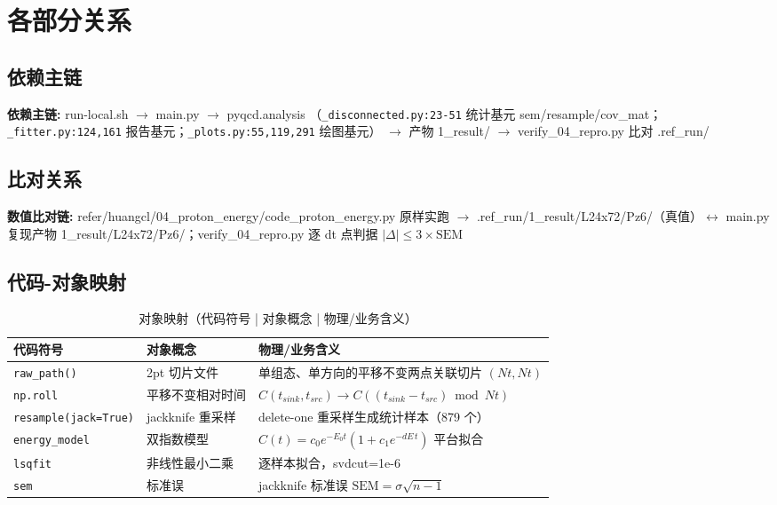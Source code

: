 \documentclass[UTF8]{ctexart}
\begin{document}
\section{各部分关系}
\subsection{依赖主链}
\begin{keybox}
\textbf{依赖主链:} \textcolor{relation}{run-local.sh $\rightarrow$ main.py $\rightarrow$ pyqcd.analysis
（\texttt{\nolinkurl{_disconnected.py:23-51}} 统计基元 sem/resample/cov\_mat；
\texttt{\nolinkurl{_fitter.py:124,161}} 报告基元；\texttt{\nolinkurl{_plots.py:55,119,291}} 绘图基元）
$\rightarrow$ 产物 1\_result/ $\rightarrow$ verify\_04\_repro.py 比对 .ref\_run/}
\end{keybox}

\subsection{比对关系}
\begin{keybox}
\textbf{数值比对链:} \textcolor{relation}{refer/huangcl/04\_proton\_energy/code\_proton\_energy.py
原样实跑 $\rightarrow$ .ref\_run/1\_result/L24x72/Pz6/（真值）$\leftrightarrow$
main.py 复现产物 1\_result/L24x72/Pz6/；verify\_04\_repro.py 逐 dt 点判据
$|\Delta| \le 3\times\text{SEM}$}
\end{keybox}

\subsection{代码-对象映射}
\begin{table}[htbp]\centering
\begin{tabularx}{\textwidth}{llX}
\toprule
代码符号 & 对象概念 & 物理/业务含义 \\
\midrule
\texttt{\nolinkurl{raw_path()}} & 2pt 切片文件 & 单组态、单方向的平移不变两点关联切片 $(Nt,Nt)$ \\
\texttt{\nolinkurl{np.roll}} & 平移不变相对时间 & $C(t_{sink},t_{src}) \to C((t_{sink}-t_{src})\bmod Nt)$ \\
\texttt{\nolinkurl{resample(jack=True)}} & jackknife 重采样 & delete-one 重采样生成统计样本（879 个） \\
\texttt{\nolinkurl{energy_model}} & 双指数模型 & $C(t)=c_0 e^{-E_0 t}(1+c_1 e^{-dE\,t})$ 平台拟合 \\
\texttt{\nolinkurl{lsqfit}} & 非线性最小二乘 & 逐样本拟合，svdcut=1e-6 \\
\texttt{\nolinkurl{sem}} & 标准误 & jackknife 标准误 $\text{SEM}=\sigma\sqrt{n-1}$ \\
\bottomrule
\end{tabularx}
\caption{对象映射（代码符号 | 对象概念 | 物理/业务含义）}
\end{table}
\end{document}
